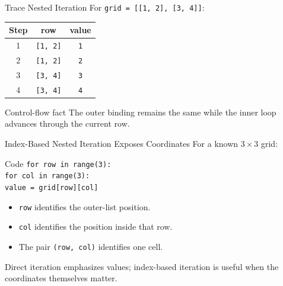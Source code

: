 \documentclass[aspectratio=169,10pt]{beamer}
\begin{document}
\begin{frame}{Trace Nested Iteration}
  For \texttt{grid = [[1, 2], [3, 4]]}:

  \begin{center}
    \renewcommand{\arraystretch}{1.30}
    \begin{tabular}{c|c|c}
      \textbf{Step} & \textbf{row} & \textbf{value} \\\hline
      1 & \texttt{[1, 2]} & \texttt{1} \\
      2 & \texttt{[1, 2]} & \texttt{2} \\
      3 & \texttt{[3, 4]} & \texttt{3} \\
      4 & \texttt{[3, 4]} & \texttt{4}
    \end{tabular}
  \end{center}

  \begin{block}{Control-flow fact}
    The outer binding remains the same while the inner loop advances through the current row.
  \end{block}
\end{frame}

\begin{frame}{Index-Based Nested Iteration Exposes Coordinates}
  For a known $3 \times 3$ grid:

  \begin{block}{Code}
    \texttt{for row in range(3):}\\
    \hspace*{0.20in}\texttt{for col in range(3):}\\
    \hspace*{0.40in}\texttt{value = grid[row][col]}
  \end{block}

  \begin{itemize}
    \item \texttt{row} identifies the outer-list position.
    \item \texttt{col} identifies the position inside that row.
    \item The pair \texttt{(row, col)} identifies one cell.
  \end{itemize}

  \begin{keyidea}
    Direct iteration emphasizes values; index-based iteration is useful when the coordinates themselves matter.
  \end{keyidea}
\end{frame}
\end{document}

